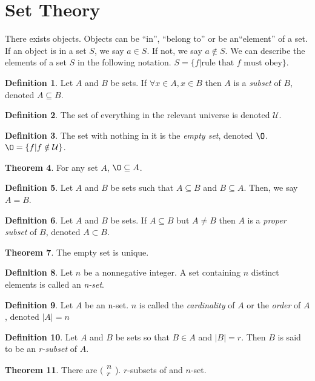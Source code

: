 \documentclass[11pt]{article}
\theoremstyle{definition}
\newtheorem{theorem}{Theorem}[section]
\newtheorem{definition}[theorem]{Definition}
\begin{document}
\section{Set Theory}
There exists objects. Objects can be ``in'', ``belong to'' or be
an``element'' of a set. If an object is in a set $S$, we say $a \in S$. If
not, we say $a \notin S$. We can describe the elements of a set $S$ in the
following notation. $S = \{f \vert \text{rule that $f$ must obey} \}$.
\begin{definition}
    Let $A$ and $B$ be sets. If $\forall x \in A, x \in B$ then $A$ is a \emph{subset} of $B$, denoted $A \subseteq B$.
\end{definition}
\begin{definition}
    The set of everything in the relevant universe is denoted $\mathcal{U}$.
\end{definition}
\begin{definition}
    The set with nothing in it is the \emph{empty set}, denoted $\O$. $\O = \{ f \vert f \notin \mathcal{U} \}$.
\end{definition}
\begin{theorem}
For any set $A$, $\O \subseteq A$.
\end{theorem}
\begin{definition}
Let $A$ and $B$ be sets such that $A \subseteq B$ and $B \subseteq A$. Then, we say $A=B$.
\end{definition}
\begin{definition}
Let $A$ and $B$ be sets. If $A \subseteq B$ but $A \neq B$ then $A$ is a \emph{proper subset} of $B$, denoted $A \subset B$.
\end{definition}
\begin{theorem}
The empty set is unique.
\end{theorem}
\begin{definition}
    Let $n$ be a nonnegative integer. A set containing $n$ distinct
    elements is called an \emph{n-set}. 
\end{definition}
\begin{definition}
    Let $A$ be an n-set. $n$ is called the \emph{cardinality} of $A$ or the \emph{order} of $A$, denoted $\vert A \vert = n$
\end{definition}
\begin{definition}
    Let $A$ and $B$ be sets so that $B \in A$ and $\vert B \vert = r$. Then $B$ is said to be an \emph{r-subset} of $A$.
\end{definition}
\begin{theorem}
    There are $(\begin{smallmatrix} n\\r \end{smallmatrix}$). $r$-subsets of and $n$-set.
\end{theorem}
\end{document}
